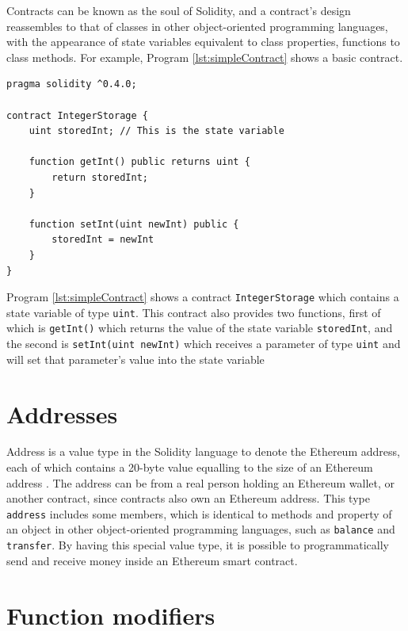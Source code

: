 \documentclass[twoside,numperchapter]{tutthesis} %
\begin{document}
Contracts can be known as the soul of Solidity, and a contract's design reassembles to that of classes in other object-oriented programming languages, with the appearance of state variables equivalent to class properties, functions to class methods. For example, Program \ref{lst:simpleContract} shows a basic contract.

\begin{lstlisting}[float,caption={A simple contract in Solidity.},label={lst:simpleContract},language=Solidity]
pragma solidity ^0.4.0;

contract IntegerStorage {
    uint storedInt; // This is the state variable
    
    function getInt() public returns uint {
        return storedInt;
    }
    
    function setInt(uint newInt) public {
        storedInt = newInt
    }
}
\end{lstlisting}
\label{lst:simpleContract}

Program \ref{lst:simpleContract} shows a contract \texttt{IntegerStorage} which contains a state variable of type \texttt{uint}. This contract also provides two functions, first of which is \texttt{getInt()} which returns the value of the state variable \texttt{storedInt}, and the second is \texttt{setInt(uint newInt)} which receives a parameter of type \texttt{uint} and will set that parameter's value into the state variable

\section{Addresses}

Address is a value type in the Solidity language to denote the Ethereum address, each of which contains a 20-byte value equalling to the size of an Ethereum address \citep{SolidityDocumentation}. The address can be from a real person holding an Ethereum wallet, or another contract, since contracts also own an Ethereum address. This type \texttt{address} includes some members, which is identical to methods and property of an object in other object-oriented programming languages, such as \texttt{balance} and \texttt{transfer}. By having this special value type, it is possible to programmatically send and receive money inside an Ethereum smart contract.

\section{Function modifiers}
\label{section:functionModifiers}
\end{document}
